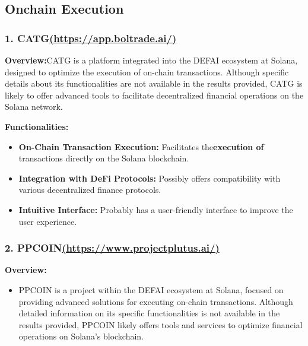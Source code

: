 \documentclass[
]{article}
\providecommand{\tightlist}{%
  \setlength{\itemsep}{0pt}\setlength{\parskip}{0pt}}
\begin{document}
\hypertarget{onchain-execution}{%
\subsection{Onchain Execution}\label{onchain-execution}}

\hypertarget{catghttpsapp.boltrade.ai}{%
\subsubsection{\texorpdfstring{1.
CATG\href{https://app.boltrade.ai/}{(https://app.boltrade.ai/)}}{1. CATG(https://app.boltrade.ai/)}}\label{catghttpsapp.boltrade.ai}}

\textbf{Overview:}CATG is a platform integrated into the DEFAI ecosystem
at Solana, designed to optimize the execution of on-chain transactions.
Although specific details about its functionalities are not available in
the results provided, CATG is likely to offer advanced tools to
facilitate decentralized financial operations on the Solana network.

\textbf{Functionalities:}

\begin{itemize}
\tightlist
\item
  \textbf{On-Chain Transaction Execution:} Facilitates
  the\textbf{execution of} transactions directly on the Solana
  blockchain.
\item
  \textbf{Integration with DeFi Protocols:} Possibly offers
  compatibility with various decentralized finance protocols.
\item
  \textbf{Intuitive Interface:} Probably has a user-friendly interface
  to improve the user experience.
\end{itemize}

\hypertarget{ppcoinhttpswww.projectplutus.ai}{%
\subsubsection{\texorpdfstring{2.
PPCOIN\href{https://www.projectplutus.ai/}{(https://www.projectplutus.ai/)}}{2. PPCOIN(https://www.projectplutus.ai/)}}\label{ppcoinhttpswww.projectplutus.ai}}

\textbf{Overview:}

\begin{itemize}
\tightlist
\item
  PPCOIN is a project within the DEFAI ecosystem at Solana, focused on
  providing advanced solutions for executing on-chain transactions.
  Although detailed information on its specific functionalities is not
  available in the results provided, PPCOIN likely offers tools and
  services to optimize financial operations on Solana's blockchain.
\end{itemize}
\end{document}
